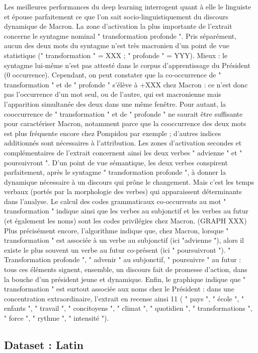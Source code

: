 Les meilleures performances du deep learning interrogent quant à elle le linguiste et épouse parfaitement ce que l'on sait socio-linguistiquement du discours dynamique de Macron.
La zone d'activation la plus importante de l'extrait concerne le syntagme nominal " transformation profonde ".
Pris séparément, aucun des deux mots du syntagme n'est très macronien d'un point de vue statistique (" transformation " = XXX ; " profonde " = YYY). Mieux : le syntagme lui-même n'est pas attesté dans le corpus d'apprentissage du Président (0 occurrence). 
Cependant, on peut constater que la co-occurrence de " transformation " et de " profonde " s'élève à +XXX chez Macron : ce n'est donc pas l'occurrence d'un mot seul, ou de l'autre, qui est macronienne mais l'apparition simultanée des deux dans une même fenêtre.
Pour autant, la cooccurrence de " transformation " et de " profonde " ne saurait être suffisante pour caractériser Macron, notamment parce que la cooccurrence des deux mots est plus fréquente encore chez Pompidou par exemple ; d'autres indices additionnés sont nécessaires à l'attribution.
Les zones d'activation secondes et complémentaires de l'extrait concernent ainsi les deux verbes " advienne " et " poursuivront ".
D'un point de vue sémantique, les deux verbes conspirent parfaitement, après le syntagme  " transformation profonde ", à donner la dynamique nécessaire à un discours qui prône le changement. Mais c'est les temps verbaux (portés par la morphologie des verbes) qui apparaissent déterminants dans l'analyse.
Le calcul des codes grammaticaux co-occurrents au mot " transformation " indique ainsi que les verbes au subjonctif et les verbes au futur (et également les noms) sont les codes privilégies chez Macron. (GRAPH XXX)
Plus précisément encore, l'algorithme indique que, chez Macron, lorsque " transformation " est associée à un verbe au subjonctif (ici "advienne "), alors il existe le plus souvent un verbe au futur co-présent (ici " poursuivront ").
" Transformation profonde ", " advenir " au subjonctif, " poursuivre " au futur : tous ces éléments signent, ensemble, un discours fait de promesse d'action, dans la bouche d'un président jeune et dynamique.
Enfin, le graphique indique que " transformation " est surtout associée aux noms chez le Président : dans une concentration extraordinaire, l'extrait en recense ainsi 11 ( " pays ", " école ", " enfants ", " travail ", " concitoyens ", " climat ", " quotidien ", " transformations ", " force ", " rythme ", " intensité ").


\subsection{Dataset : Latin}

